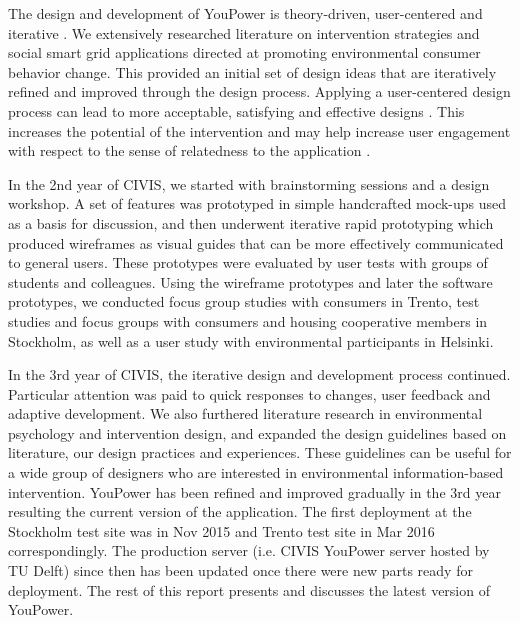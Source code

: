

The design and development of YouPower is theory-driven, user-centered and iterative \citep{Leffingwell2000,Leffingwell2011}. We extensively researched literature on intervention strategies and social smart grid applications directed at promoting environmental consumer behavior change. This provided an initial set of design ideas that are iteratively refined and improved through the design process. Applying a user-centered design process can lead to more acceptable, satisfying and effective designs \citep{Brynjarsdottir2012}. This increases the potential of the intervention \citep{dick2012empowering} and may help increase user engagement with respect to the sense of relatedness to the application \citep{pierce2003state,schwartz2015people,edward2015review}. 

In the 2nd year of CIVIS, we started with brainstorming sessions and a design workshop. A set of features was prototyped in simple handcrafted mock-ups used as a basis for discussion, and then underwent iterative rapid prototyping which produced wireframes as visual guides that can be more effectively communicated to general users. These prototypes were evaluated by user tests with groups of students and colleagues. Using the wireframe prototypes and later the software prototypes, we conducted focus group studies with consumers in Trento, test studies and focus groups with consumers and housing cooperative members in Stockholm, as well as a user study with environmental participants in Helsinki. 

In the 3rd year of CIVIS, the iterative design and development process continued. Particular attention was paid to quick responses to changes, user feedback and adaptive development. We also furthered literature research in environmental psychology and intervention design, and expanded the design guidelines based on literature, our design practices and experiences. These guidelines can be useful for a wide group of designers who are interested in environmental information-based intervention. YouPower has been refined and improved gradually in the 3rd year resulting the current version of the application. The first deployment at the Stockholm test site was in Nov 2015 and Trento test site in Mar 2016 correspondingly. The production server (i.e. CIVIS YouPower server hosted by TU Delft) since then has been updated once there were new parts ready for deployment.  
The rest of this report presents and discusses the latest version of YouPower. 

 
 

